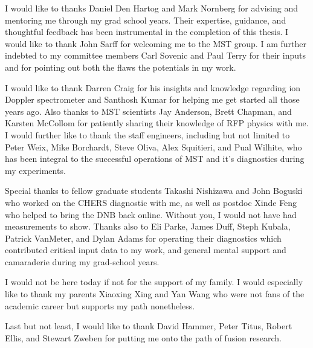 

I would like to thanks Daniel Den Hartog and Mark Nornberg for advising and mentoring me through my grad school years. Their expertise, guidance, and thoughtful feedback has been instrumental in the completion of this thesis. I would like to thank John Sarff for welcoming me to the MST group. I am further indebted to my committee members Carl Sovenic and Paul Terry for their inputs and for pointing out both the flaws the potentials in my work.

I would like to thank Darren Craig for his insights and knowledge regarding ion Doppler spectrometer and Santhosh Kumar for helping me get started all those years ago. Also thanks to MST scientists Jay Anderson, Brett Chapman, and Karsten McCollom for patiently sharing their knowledge of RFP physics with me. I would further like to thank the staff engineers, including but not limited to Peter Weix, Mike Borchardt, Steve Oliva, Alex Squitieri, and Pual Wilhite, who has been integral to the successful operations of MST and it's diagnostics during my experiments.

Special thanks to fellow graduate students Takashi Nishizawa and John Boguski who worked on the CHERS diagnostic with me, as well as postdoc Xinde Feng who helped to bring the DNB back online. Without you, I would not have had measurements to show. Thanks also to Eli Parke, James Duff, Steph Kubala, Patrick VanMeter, and Dylan Adams for operating their diagnostics which contributed critical input data to my work, and general mental support and camaraderie during my grad-school years.

\begin{CJK*}{UTF8}{gbsn}
I would not be here today if not for the support of my family. I would especially like to thank my parents Xiaoxing Xing and Yan Wang who were not fans of the academic career but supports my path nonetheless. 
\end{CJK*}

Last but not least, I would like to thank David Hammer, Peter Titus, Robert Ellis, and Stewart Zweben for putting me onto the path of fusion research. 

\clearpage
